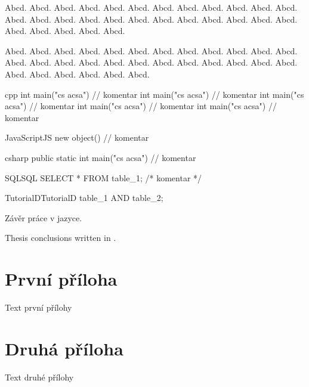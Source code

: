 \documentclass[
  master=false,               %
  font=sans,                  %
  printversion=false,         %
  joinlists=true,             %
  glossaries=true,            %
  figures=true,               %
  tables=true,                %
  sourcecodes=true,					  %
  theorems=true,						  %
  bibencoding=utf8,           %
  language=czech,             %
  encoding=utf8,              %
  field=inf,                  %
  index=true,                 %
  biblatex=true               %
]{updiplom}
\begin{document}
\begin{consequence}
Abcd. Abcd. Abcd. Abcd. Abcd. Abcd. Abcd. Abcd. Abcd. Abcd. Abcd. Abcd. Abcd. Abcd. Abcd. Abcd. Abcd. Abcd. Abcd. Abcd. Abcd. Abcd. Abcd. Abcd. Abcd. Abcd. Abcd. Abcd. Abcd. 
\end{consequence}

\begin{theorem}
Abcd. Abcd. Abcd. Abcd. Abcd. Abcd. Abcd. Abcd. Abcd. Abcd. Abcd. Abcd. Abcd. Abcd. Abcd. Abcd. Abcd. Abcd. Abcd. Abcd. Abcd. Abcd. Abcd. Abcd. Abcd. Abcd. Abcd. Abcd. Abcd. Abcd. 
\end{theorem}


\begin{upcode}{cpp}{}{\cpp}
int main("cs acsa") // komentar
int main("cs acsa") // komentar
int main("cs acsa") // komentar
int main("cs acsa") // komentar
int main("cs acsa") // komentar
\end{upcode}

\begin{upcode}{JavaScript}{}{JS}
new object() // komentar
\end{upcode}

\begin{upcode}{csharp}{}{\csharp}
public static int main("cs acsa") // komentar
\end{upcode}

\begin{upcode}{SQL}{}{SQL}
SELECT * FROM table_1; /* komentar */
\end{upcode}

\begin{upcode}{TutorialD}{}{TutorialD}
table_1 AND table_2;
\end{upcode}

\begin{upconclusions}
Závěr práce v  jazyce.
\end{upconclusions}

\begin{upconclusions}[english]
Thesis conclusions written in .
\end{upconclusions}

\appendix
\section{První příloha}
Text první přílohy

\section{Druhá příloha}
Text druhé přílohy
\end{document}

